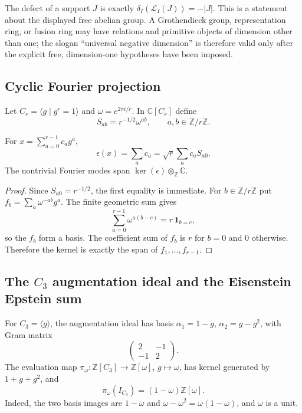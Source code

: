 The defect of a support $J$ is exactly
$\delta_I(\mathcal L_I(J))=-|J|$.  This is a statement about the displayed
free abelian group.  A Grothendieck group, representation ring, or fusion
ring may have relations and primitive objects of dimension other than one;
the slogan ``universal negative dimension'' is therefore valid only after
the explicit free, dimension-one hypotheses have been imposed.

\subsection{Cyclic Fourier projection}

Let $C_r=\langle g\mid g^r=1\rangle$ and
$\omega=e^{2\pi i/r}$.  In $\mathbb C[C_r]$ define
\[
 S_{ab}=r^{-1/2}\omega^{ab},\qquad a,b\in\mathbb Z/r\mathbb Z.
\]

\begin{proposition}
\label{prop:primitive-fourier}
For $x=\sum_{a=0}^{r-1}c_ag^a$,
\[
 \epsilon(x)=\sum_a c_a=\sqrt r\sum_a c_aS_{a0}.
\]
The nontrivial Fourier modes span
$\ker(\epsilon)\otimes_{\mathbb Z}\mathbb C$.
\end{proposition}

\begin{proof}
Since $S_{a0}=r^{-1/2}$, the first equality is immediate.  For
$b\in\mathbb Z/r\mathbb Z$ put
$f_b=\sum_a\omega^{-ab}g^a$.  The finite geometric sum gives
\[
 \sum_{a=0}^{r-1}\omega^{a(b-c)}=r\,\mathbf 1_{b=c},
\]
so the $f_b$ form a basis.  The coefficient sum of $f_b$ is $r$ for $b=0$
and $0$ otherwise.  Therefore the kernel is exactly the span of
$f_1,\ldots,f_{r-1}$.
\end{proof}

\subsection{The $C_3$ augmentation ideal and the Eisenstein Epstein sum}

For $C_3=\langle g\rangle$, the augmentation ideal has basis
$\alpha_1=1-g$, $\alpha_2=g-g^2$, with Gram matrix
\[
 \begin{pmatrix}2&-1\\-1&2\end{pmatrix}.
\]
The evaluation map $\pi_\omega:\mathbb Z[C_3]\to\mathbb Z[\omega]$,
$g\mapsto\omega$, has kernel generated by $1+g+g^2$, and
\[
 \pi_\omega(I_{C_3})=(1-\omega)\mathbb Z[\omega].
\]
Indeed, the two basis images are $1-\omega$ and
$\omega-\omega^2=\omega(1-\omega)$, and $\omega$ is a unit.

